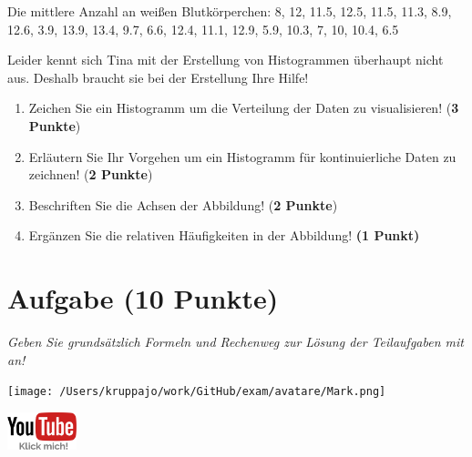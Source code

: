 \documentclass[a4paper, 9pt]{scrartcl}\usepackage[]{graphicx}\usepackage[]{xcolor}
\begin{document}
\begin{center}
Die mittlere Anzahl an weißen Blutkörperchen: 8, 12, 11.5, 12.5, 11.5, 11.3, 8.9, 12.6, 3.9, 13.9, 13.4, 9.7, 6.6, 12.4, 11.1, 12.9, 5.9, 10.3, 7, 10, 10.4, 6.5
\end{center}

Leider kennt sich Tina mit der Erstellung von Histogrammen überhaupt nicht aus. Deshalb braucht sie bei der Erstellung Ihre Hilfe!

\begin{enumerate}
\item Zeichen Sie ein Histogramm um die Verteilung der Daten zu visualisieren! (\textbf{3 Punkte})
 \item Erläutern Sie Ihr Vorgehen um ein Histogramm für kontinuierliche Daten zu zeichnen!  (\textbf{2 Punkte})
\item Beschriften Sie die Achsen der Abbildung! (\textbf{2 Punkte})
\item Ergänzen Sie die relativen Häufigkeiten in der Abbildung! \textbf{(1 Punkt)}  
\end{enumerate}

 
\clearpage

\section{Aufgabe \hfill (10 Punkte)}

\textit{Geben Sie grundsätzlich Formeln und Rechenweg zur Lösung der Teilaufgaben mit an!} \\[1Ex]
 

 
\begin{minipage}[t]{0.5\textwidth}
\texttt{[image: /Users/kruppajo/work/GitHub/exam/avatare/Mark.png]}
\end{minipage}
\begin{minipage}[t]{0.5\textwidth}
\hfill
\href{https://youtu.be/VAqiUdV4WQ0}{\includegraphics[width = 2cm]{img/youtube}}
\end{minipage}
\vspace{-3ex}
\end{document}
